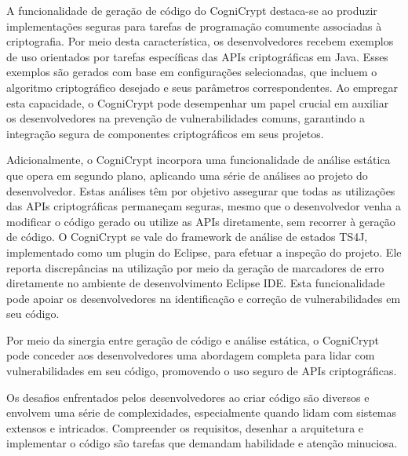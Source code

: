 A funcionalidade de geração de código do CogniCrypt destaca-se ao produzir implementações seguras para tarefas de programação comumente associadas à criptografia. Por meio desta característica, os desenvolvedores recebem exemplos de uso orientados por tarefas específicas das APIs criptográficas em Java. Esses exemplos são gerados com base em configurações selecionadas, que incluem o algoritmo criptográfico desejado e seus parâmetros correspondentes. Ao empregar esta capacidade, o CogniCrypt pode desempenhar um papel crucial em auxiliar os desenvolvedores na prevenção de vulnerabilidades comuns, garantindo a integração segura de componentes criptográficos em seus projetos.

Adicionalmente, o CogniCrypt incorpora uma funcionalidade de análise estática que opera em segundo plano, aplicando uma série de análises ao projeto do desenvolvedor. Estas análises têm por objetivo assegurar que todas as utilizações das APIs criptográficas permaneçam seguras, mesmo que o desenvolvedor venha a modificar o código gerado ou utilize as APIs diretamente, sem recorrer à geração de código. O CogniCrypt se vale do framework de análise de estados TS4J, implementado como um plugin do Eclipse, para efetuar a inspeção do projeto. Ele reporta discrepâncias na utilização por meio da geração de marcadores de erro diretamente no ambiente de desenvolvimento Eclipse IDE. Esta funcionalidade pode apoiar os desenvolvedores na identificação e correção de vulnerabilidades em seu código.

Por meio da sinergia entre geração de código e análise estática, o CogniCrypt pode conceder aos desenvolvedores uma abordagem completa para lidar com vulnerabilidades em seu código, promovendo o uso seguro de APIs criptográficas.



Os desafios enfrentados pelos desenvolvedores ao criar código são diversos e envolvem uma série de complexidades, especialmente quando lidam com sistemas extensos e intricados. Compreender os requisitos, desenhar a arquitetura e implementar o código são tarefas que demandam habilidade e atenção minuciosa.

